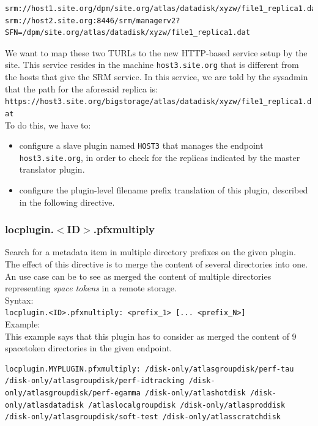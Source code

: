 \documentclass[12pt]{article} %
\begin{document}
\begin{lstlisting}
srm://host1.site.org/dpm/site.org/atlas/datadisk/xyzw/file1_replica1.dat
srm://host2.site.org:8446/srm/managerv2? SFN=/dpm/site.org/atlas/datadisk/xyzw/file1_replica1.dat
\end{lstlisting}

We want to map these two TURLs to the new HTTP-based service setup by the site. This service resides in the machine \lstinline"host3.site.org" that is different from the hosts that give the SRM service. In this service, we are told by the sysadmin that the path for the aforesaid replica is:\\

\lstinline"https://host3.site.org/bigstorage/atlas/datadisk/xyzw/file1_replica1.dat"\\




To do this, we have to:

\begin{itemize}
 \item configure a slave plugin named \lstinline"HOST3" that manages the endpoint \lstinline"host3.site.org", in order to check for the replicas indicated by the master translator plugin.
 \item configure the plugin-level filename prefix translation of this plugin, described in the following directive.
\end{itemize}


\subsubsection{locplugin.$<$ID$>$.pfxmultiply}
Search for a metadata item in multiple directory prefixes on the given plugin. The effect of this directive is to merge the content of several directories into one. An use case can be to see as merged the content of multiple directories representing \textit{space tokens} in a remote storage.\\

Syntax:\\
\lstinline{locplugin.<ID>.pfxmultiply: <prefix_1> [... <prefix_N>]}\\

Example:\\
This example says that this plugin has to consider as merged the content of 9 spacetoken directories in the given endpoint.\\
\begin{lstlisting}
locplugin.MYPLUGIN.pfxmultiply: /disk-only/atlasgroupdisk/perf-tau /disk-only/atlasgroupdisk/perf-idtracking /disk-only/atlasgroupdisk/perf-egamma /disk-only/atlashotdisk /disk-only/atlasdatadisk /atlaslocalgroupdisk /disk-only/atlasproddisk /disk-only/atlasgroupdisk/soft-test /disk-only/atlasscratchdisk
\end{lstlisting}
\end{document}
